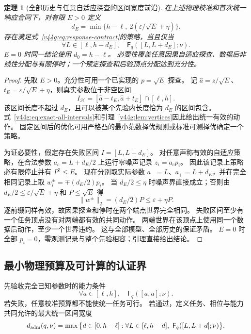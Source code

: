 \documentclass[11pt,a4paper]{article}
\numberwithin{equation}{section}
\newtheorem{theorem}{定理}[section]
\theoremstyle{definition}
\begin{document}
\begin{theorem}[全部历史与任意自适应探查的区间宽度前沿]
\label{v44g:thm:all-history}
在上述物理校准和首次统一响应合同下，对有限 $E>0$ 定义
\begin{equation}
 d_E=\min\{h-\ell,\ 2(\varepsilon/\sqrt E+\eta)\}.
 \label{v44g:eq:data-width}
\end{equation}
存在满足式~\eqref{v44g:eq:response-contract}的策略，当且仅当
\begin{equation}
 \boxed{\quad
 \forall L\in[\ell,h-d_E],\quad
 \mathsf F_q([L,L+d_E];\nu).
 \quad}
 \label{v44g:eq:exact-all-intervals}
\end{equation}
$E=0$ 时同一结论使用 $d_0=h-\ell$。
必要性覆盖任意因果自适应探查、数据后非线性分配与有限停时；一个预定探查和后验顶点分配达到充分性。
\end{theorem}
\begin{proof}
先取 $E>0$。充分性可用一个已实现的 $p=\sqrt E$ 探查。
记 $\widehat a=z/\sqrt E$、$t_E=\varepsilon/\sqrt E+\eta$，则真实参数位于非空区间
\[
 I_{\mathcal H}=[\widehat a-t_E,\widehat a+t_E]\cap[\ell,h].
\]
该区间长度不超过 $d_E$，且可以被某个先验内长度恰为 $d_E$ 的区间包含。
式~\eqref{v44g:eq:exact-all-intervals}和引理~\ref{v44g:lem:vertices}因此给出统一有效的动作。
固定区间后的优化可用严格凸的最小范数择优规则或标准可测择优确定一个策略。

为证必要性，假定存在失败区间 $I=[L,L+d_E]$。
对任意声称有效的自适应策略，在合法参数 $a_c=L+d_E/2$ 上运行零噪声记录 $z_i=a_cp_i$。
因此该记录上策略必有限停止并有 $P^2\le E$。
现在分别取实际参数 $a_-=L$、$a_+=L+d_E$，并在完全相同记录上取
$w_i^\pm=\mp(d_E/2)p_i$。
当 $d_E/2\le\eta$ 时噪声界直接成立；否则由
$d_E/2\le\varepsilon/\sqrt E+\eta$ 和 $P\le\sqrt E$ 得
\[
 \|w^\pm\|_2=(d_E/2)P\le\varepsilon+\eta P.
\]
逐前缀同样有效，故因果探查和停时在两个端点世界完全相同。
失败区间至少有一个任务顶点没有对两端都有效的共同动作。
两端世界在该顶点上使用同一个数据后动作，至少一个世界违约。
这与全部模型、全部历史的保证矛盾。
$E=0$ 时全部 $p_i=0$，零观测记录与整个先验相容；引理直接给出结论。
\end{proof}

\subsection{最小物理预算及可计算的认证界}
先验收完全已知参数时的能力条件
\begin{equation}
 \forall a\in[\ell,h],\quad\mathsf F_q([a,a];\nu).
 \label{v44g:eq:known-feasibility}
\end{equation}
若失败，任意校准预算都不能使统一任务可行。
若通过，定义任务、相位与能力共同允许的最大统一区间宽度
\begin{equation}
 d_{\rm adm}(q,\nu)=
 \max\big\{d\in[0,h-\ell]:
     \forall L\in[\ell,h-d],\ \mathsf F_q([L,L+d];\nu)\big\}.
 \label{v44g:eq:admissible-width}
\end{equation}
\end{document}
